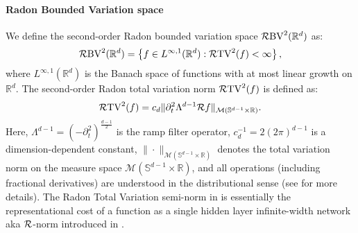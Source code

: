 \paragraph{Radon Bounded Variation space} We define the second-order Radon bounded variation space $\mathcal{R}\mathrm{BV}^2({\mathbb{R}^d})$ as:
\begin{equation}
    \mathcal{R}\mathrm{BV}^2({\mathbb{R}^d}) = \left\{f \in L^{\infty,1}(\mathbb{R}^d) : \mathcal{R}\mathrm{TV}^2({f}) < \infty\right\},
\end{equation}
where $L^{\infty,1}(\mathbb{R}^d)$ is the Banach space of functions with at most linear growth on $\mathbb{R}^d$. The second-order Radon total variation norm $\mathcal{R}\mathrm{TV}^2({f})$ is defined as:
\begin{equation}
    \mathcal{R}\mathrm{TV}^2({f}) = c_d \|\partial_t^2\Lambda^{d-1}\mathcal{R}f\|_{\mathcal{M}(\mathbb{S}^{d-1}\times\mathbb{R})}. \label{eq: rnorm}
\end{equation}
Here, $\Lambda^{d-1} = (-\partial_t^2)^{\frac{d-1}{2}}$ is the ramp filter operator, $c_d^{-1} = 2(2\pi)^{d-1}$ is a dimension-dependent constant, $\|\cdot\|_{\mathcal{M}(\mathbb{S}^{d-1}\times\mathbb{R})}$ denotes the total variation norm on the measure space $\mathcal{M}(\mathbb{S}^{d-1}\times\mathbb{R})$, and all operations (including fractional derivatives) are understood 
in the distributional sense (see \cite{Parhi2020BanachSR} for more details). The Radon Total Variation semi-norm in  is essentially the representational cost of a function as a single hidden layer infinite-width network aka ${\mathcal{R}}$-norm 
introduced in \citet{Ongie2020A}.

